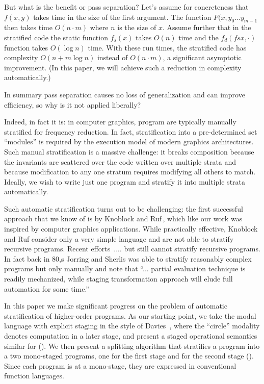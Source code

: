 But what is the benefit or pass separation? Let's assume for
concreteness that $f(x,y)$ takes time in the size of the first
argument.  The function $F(x, y_0 \ldots y_{m-1}$ then takes time $O(n
\cdot m)$ where $n$ is the size of $x$. Assume further that in the
stratified code the static function $f_s(x)$ takes $O(n)$ time and the
$f_d(fsx, \cdot)$ function takes $O(\log{n})$ time.  With these run
times, the stratified code has complexity $O(n + m\log{n})$ instead of
$O(n \cdot m)$, a significant asymptotic improvement.  (In this paper,
we will achieve such a reduction in complexity automatically.)

In summary pass separation causes no loss of generalization and can
improve efficiency, so why is it not applied liberally? 

Indeed, in fact it is: in computer graphics, program are typically
manually stratified for frequency reduction.  In fact, stratification
into a pre-determined set ``modules'' is required by the execution
model of modern graphics architectures.  Such manual stratification is
a massive challenge: it breaks composition because the invariants are
scattered over the code written over multiple strata and because
modification to any one stratum requires modifying all others to
match.  Ideally, we wish to write just one program and stratify it
into multiple strata automatically.

Such automatic stratification turns out to be challenging: the first
successful approach that we know of is by Knoblock and
Ruf\,\cite{knoblock96}, which like our work was inspired by computer
graphics applications.  While practically effective, Knoblock and Ruf
consider only a very simple language and are not able to stratify
recursive programs.  Recent
efforts\,\cite{Proudfoot:2001,Foley:2011,He:2014} .... 
but still cannot stratify recursive programs.
%
In fact back in 80,s Jorring and Sherlis was able to stratify
reasonably complex programs but only manually and note that
``... partial evaluation technique is readily mechanized, while
staging transformation approach will elude full automation for some
time.''

In this paper we make significant progress on the problem of automatic
stratification of higher-order programs.  As our starting point, we
take the modal language \langname with explicit staging in the style
of Davies~\cite{Davies}, where the ``circle'' modality denotes
computation in a later stage, and present a staged operational
semantics similar for \langname ().  We then present
a splitting algorithm that stratifies a \langname program into a two
mono-staged programs, one for the first stage and for the second stage
().  Since each program is at a mono-stage, they are
expressed in conventional function languages.

